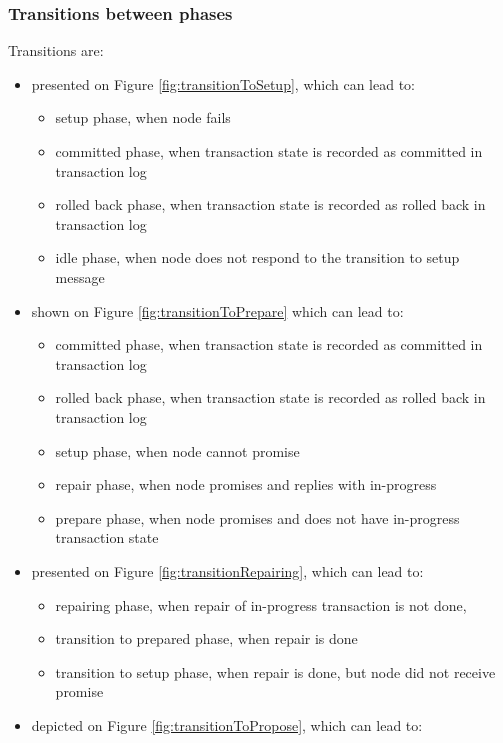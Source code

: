 \subsubsection{Transitions between phases}
Transitions are:
\begin{itemize}
\item \setupTransition presented on Figure \ref{fig:transitionToSetup}, which can lead to:
	\begin{itemize}
		\item setup phase, when node  fails
		\item committed phase, when transaction state \txState is recorded as committed in transaction log \txLog  
		\item rolled back phase, when transaction state \txState is recorded as rolled back in transaction log \txLog
		\item idle phase, when node  does not respond to the transition to setup message
	\end{itemize}
\item \prepareTransition shown on Figure \ref{fig:transitionToPrepare} which can lead to:
	\begin{itemize}
		\item committed phase, when transaction state \txState is recorded as committed in transaction log \txLog  
		\item rolled back phase, when transaction state \txState is recorded as rolled back in transaction log \txLog
		\item setup phase, when node  cannot promise
		\item repair phase, when node  promises and replies with in-progress \txState
		\item prepare phase, when node  promises and does not have in-progress transaction state \txState 
	\end{itemize}
\item \repairingTransition presented on Figure \ref{fig:transitionRepairing}, which can lead to:
	\begin{itemize}
		\item repairing phase, when repair of in-progress transaction is not done,
		\item transition to prepared phase, when repair is done
		\item transition to setup phase, when repair is done, but node  did not receive promise
	\end{itemize}
\item \proposeTransition depicted on Figure \ref{fig:transitionToPropose}, which can lead to:

\end{itemize}
